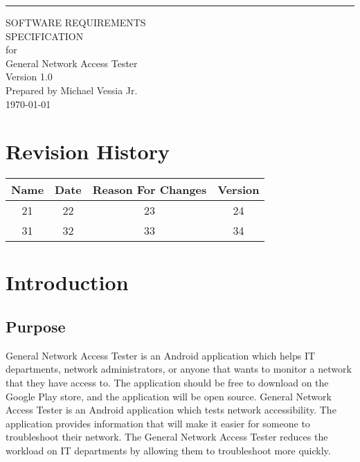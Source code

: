 \documentclass{scrreprt}
\date{}
\def\myversion{1.0 }
\def\author{Michael Vessia Jr.}
\begin{document}
\begin{flushright}
  \rule{16cm}{5pt}\vskip1cm
  \begin{bfseries}
    \Huge{SOFTWARE REQUIREMENTS\\ SPECIFICATION}\\
    \vspace{1.9cm}
    for\\
    \vspace{1.9cm}
    General Network Access Tester\\
    \vspace{1.9cm}
    \LARGE{Version \myversion}\\
    \vspace{1.9cm}
    Prepared by \author\\
    \vspace{1.9cm}
    \today\\
  \end{bfseries}
\end{flushright}

\tableofcontents


\chapter*{Revision History}

\begin{center}
  \begin{tabular}{|c|c|c|c|}
    \hline
    Name & Date & Reason For Changes & Version\\
    \hline
    21 & 22 & 23 & 24\\
    \hline
    31 & 32 & 33 & 34\\
    \hline
  \end{tabular}
\end{center}

\chapter{Introduction}

\section{Purpose}

General Network Access Tester is an Android application which helps IT departments, network administrators, or anyone that wants to monitor a network that they have access to. The application should be free to download on the Google Play store, and the application will be open source. General Network Access Tester is an Android application which tests network accessibility.  The application provides information that will make it easier for someone to troubleshoot their network.  The General Network Access Tester  reduces the workload on IT departments by allowing them to troubleshoot more quickly.
\end{document}
